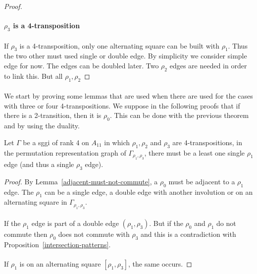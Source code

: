 \begin{proof}
  \paragraph{}
  \textbf{$\rho_3$ is a 4-transposition}

  \paragraph{}
  If $\rho_3$ is a 4-transposition, only one alternating square can be built with $\rho_1$. Thus the two other must used single or double edge. By simplicity we consider simple edge for now. The edges can be doubled later. Two $\rho_2$ edges are needed in order to link this. But all $\rho_1, \rho_2$

\end{proof}

\paragraph{}
We start by proving some lemmas that are used when there are used for the cases with three or four 4-transpositions. We suppose in the following proofs that if there is a 2-transition, then it is $\rho_0$. This can be done with the previous theorem and by using the duality.

\begin{lemma}
  Let $\Gamma$ be a sggi of rank 4 on $A_{11}$ in which $\rho_1, \rho_2$ and $\rho_3$ are 4-transpositions, in the permutation representation graph of $\Gamma_{\rho_1, \rho_3}$, there must be a least one single $\rho_1$ edge (and thus a single $\rho_3$ edge).
\end{lemma}

\begin{proof}
  By Lemma~\ref{adjacent-must-not-commute}, a $\rho_0$ must be adjacent to a $\rho_1$ edge. The $\rho_1$ can be a single edge, a double edge with another involution or on an alternating square in $\Gamma_{\rho_1, \rho_3}$.

  \paragraph{}
  If the $\rho_1$ edge is part of a double edge $(\rho_1, \rho_3)$. But if the $\rho_0$ and $\rho_1$ do not commute then $\rho_0$ does not commute with $\rho_3$ and this is a contradiction with Proposition~\ref{intersection-patterns}.

  \paragraph{}
  If $\rho_1$ is on an alternating square $[\rho_1, \rho_3]$, the same occurs.

\end{proof}

